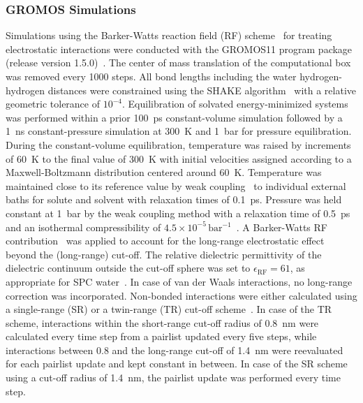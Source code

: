 \documentclass[9pt,lessons]{livecoms}
\begin{document}
\subsubsection*{GROMOS Simulations}

Simulations using the Barker-Watts reaction field (RF) scheme~\cite{barker1973monte}  for treating electrostatic interactions 
were conducted with the GROMOS11 program package (release version 1.5.0)~\cite{kunz2012new, riniker2011calculation, schmid2012architecture}.
The center of mass translation of the computational box was removed every 1000 steps.
All bond lengths including the water hydrogen-hydrogen distances were constrained using the SHAKE algorithm~\cite{ryckaert1977numerical} with a relative geometric tolerance of $10^{-4}$.
Equilibration of solvated energy-minimized systems was performed within a prior 100~ps constant-volume simulation followed by a 1~ns constant-pressure simulation at 300~K and 1~bar for pressure equilibration.
During the constant-volume equilibration, temperature was raised by increments of 60~K to the final value of 300~K %
with initial velocities assigned according to a Maxwell-Boltzmann distribution centered around 60~K.
Temperature was maintained close to its reference value by weak coupling~\cite{berendsen1984molecular} to individual external baths for solute and solvent with relaxation times of 0.1~ps.
Pressure was held constant at 1~bar by the weak coupling method with a relaxation time of 0.5~ps and an isothermal compressibility of $4.5\times 10^{-5}\,\mathrm{bar^{-1}}$~\cite{kell1967precise}. 
A Barker-Watts RF contribution~\cite{barker1973monte} was applied to account for the long-range electrostatic effect beyond the (long-range) cut-off.
The relative dielectric permittivity of the dielectric continuum outside the cut-off sphere was set to $\epsilon_\mathrm{RF} = 61$, as appropriate for SPC water~\cite{heinz2001comparison}.
In case of van der Waals interactions, no long-range correction was incorporated.
%
Non-bonded interactions were either calculated using a single-range (SR) or a twin-range (TR) cut-off scheme~\cite{zuiderweg1985determination}.
In case of the TR scheme, interactions within the short-range cut-off radius of 0.8~nm were calculated every time step from a pairlist updated every five steps, 
while interactions between 0.8 and the long-range cut-off of 1.4~nm were reevaluated for each pairlist update and kept constant in between.
In case of the SR scheme using a cut-off radius of 1.4~nm, the pairlist update was performed every time step.
\end{document}
